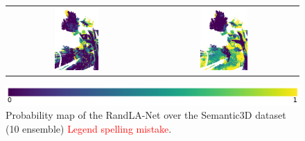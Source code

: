 \begin{figure}[h!]
\begin{tabular}{cc}
            \includegraphics[width=0.33\textwidth, height=0.18\textheight]{images/ood_imgs/de_sem3d/de_ent_10_3.pdf}&
            \includegraphics[width=0.33\textwidth, height=0.18\textheight]{images/sem3d_of/de_ent_sem3d_of_3.pdf}\\
        \end{tabular}
        \includegraphics[scale=0.45]{images/prob_legend.pdf}
        \caption{Probability map of the RandLA-Net over the Semantic3D dataset (10 ensemble) \textcolor{red}{Legend spelling mistake}.}
        \label{fig:de_entmap_vis_sem3d_OF}
    \end{figure}
